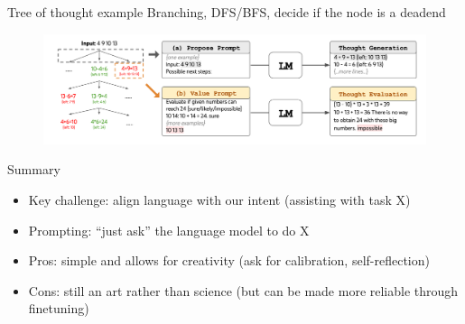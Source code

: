 \documentclass[usenames,dvipsnames,notes,11pt,aspectratio=169,hyperref={colorlinks=true, linkcolor=blue}]{beamer}
\begin{document}
\begin{frame}
    {Tree of thought example}{}
    Branching, DFS/BFS, decide if the node is a deadend
    \begin{figure}
        \includegraphics[width=\textwidth]{figures/tot-24}
    \end{figure}
\end{frame}

\begin{frame}
    {Summary}
    \begin{itemize}
        \itemsep1em
        \item Key challenge: align language with our intent (assisting with task X)
        \item Prompting: ``just ask'' the language model to do X
        \item Pros: simple and allows for creativity (ask for calibration, self-reflection)
        \item Cons: still an art rather than science (but can be made more reliable through finetuning)
    \end{itemize}
\end{frame}
\end{document}
